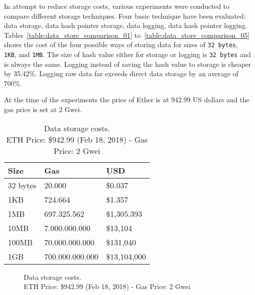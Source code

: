 In attempt to reduce storage costs, various experiments were conducted to compare different storage techniques. Four basic technique have been evaluated: data storage, data hash pointer storage, data logging, data hash pointer logging. Tables~\ref{table:data_store_comparison_01} to~\ref{table:data_store_comparison_05} shows the cost of the four possible ways of storing data for sizes of \verb|32 bytes|, \verb|1KB|, and \verb|1MB|. The size of hash value either for storage or logging is \verb|32 bytes| and is always the same. Logging instead of saving the hash value to storage is cheaper by 35.42\%. Logging raw data far exceeds direct data storage by an average of 700\%.

At the time of the experiments the price of Ether is at 942.99 US dollars and the gas price is set at 2 Gwei.

\begin{table}[!htb]
\centering
\caption{Data storage costs.\\ ETH Price: \$942.99 (Feb 18, 2018) - Gas Price: 2 Gwei}
\begin{tabular}{|l|l|l|}
\hline
 Size & Gas  & USD \\ \hline
 32 bytes & 20.000  & \$0.037 \\ \hline
 1KB & 724.664  & \$1.357 \\ \hline
 1MB & 697.325.562  & \$1,305.393 \\ \hline
 10MB & 7.000.000.000  & \$13,104 \\ \hline
 100MB & 70.000.000.000  & \$131,040 \\ \hline
 1GB & 700.000.000.000  & \$13,104,000 \\ \hline
\end{tabular}
\captionsetup{format=hang, justification=centering}
\label{table:bytes_usd_cost}
\end{table}

\begin{figure}[!htb]
  \centering
  \captionsetup{format=hang, justification=centering}
  \caption{Data storage costs.\\ ETH Price: \$942.99 (Feb 18, 2018) - Gas Price: 2 Gwei}
  \label{fig:bytes_usd_cost}
\end{figure}

